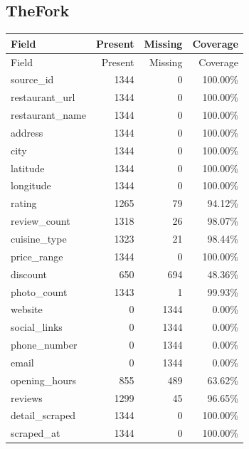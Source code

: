 \subsection{TheFork}
{\small
\begin{longtable}{lrrr}
\toprule
Field & Present & Missing & Coverage \\
\midrule
\endfirsthead
\toprule
Field & Present & Missing & Coverage \\
\midrule
\endhead
source\_id & 1344 & 0 & 100.00\% \\
restaurant\_url & 1344 & 0 & 100.00\% \\
restaurant\_name & 1344 & 0 & 100.00\% \\
address & 1344 & 0 & 100.00\% \\
city & 1344 & 0 & 100.00\% \\
latitude & 1344 & 0 & 100.00\% \\
longitude & 1344 & 0 & 100.00\% \\
rating & 1265 & 79 & 94.12\% \\
review\_count & 1318 & 26 & 98.07\% \\
cuisine\_type & 1323 & 21 & 98.44\% \\
price\_range & 1344 & 0 & 100.00\% \\
discount & 650 & 694 & 48.36\% \\
photo\_count & 1343 & 1 & 99.93\% \\
website & 0 & 1344 & 0.00\% \\
social\_links & 0 & 1344 & 0.00\% \\
phone\_number & 0 & 1344 & 0.00\% \\
email & 0 & 1344 & 0.00\% \\
opening\_hours & 855 & 489 & 63.62\% \\
reviews & 1299 & 45 & 96.65\% \\
detail\_scraped & 1344 & 0 & 100.00\% \\
scraped\_at & 1344 & 0 & 100.00\% \\
\bottomrule
\end{longtable}
}
